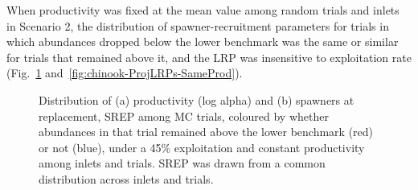 \documentclass[11pt]{book}
\begin{document}
When productivity was fixed at the mean value among random trials and inlets in Scenario 2, the distribution of spawner-recruitment parameters for trials in which abundances dropped below the lower benchmark was the same or similar for trials that remained above it, and the LRP was insensitive to exploitation rate (Fig.~\ref{fig:chinook-SRHistSameProd} and~\ref{fig:chinook-ProjLRPs-SameProd}).
\begin{figure}[htb]

{\centering {} 

}

\caption{Distribution of (a) productivity (log alpha) and (b) spawners at replacement, SREP among MC trials, coloured by whether abundances in that trial remained above the lower benchmark (red) or not (blue), under a 45\% exploitation and constant productivity among inlets and trials. SREP was drawn from a common distribution across inlets and trials. }\label{fig:chinook-SRHistSameProd}
\end{figure}
\end{document}
